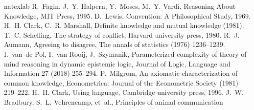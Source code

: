 \documentclass[twocolumn,a4paper,superscriptaddress,nofootinbib]{revtex4}
\begin{document}
\if{} 
\begin{thebibliography}{71}
\expandafter\ifx\csname natexlab\endcsname\relax\def\natexlab#1{#1}\fi
\providecommand{\bibinfo}[2]{#2}
\ifx\xfnm\relax \def\xfnm[#1]{\unskip,\space#1}\fi
\bibinfo{author}{R.~Fagin}, \bibinfo{author}{J.~Y. Halpern},
  \bibinfo{author}{Y.~Moses}, \bibinfo{author}{M.~Y. Vardi},
  \bibinfo{title}{Reasoning About Knowledge}, \bibinfo{publisher}{MIT Press},
  \bibinfo{year}{1995}.
\bibinfo{author}{D.~Lewis}, \bibinfo{title}{Convention: A Philosophical Study},
  \bibinfo{year}{1969}.
\bibinfo{author}{H.~H. Clark}, \bibinfo{author}{C.~R. Marshall},
\newblock \bibinfo{title}{Definite knowledge and mutual knowledge}
  (\bibinfo{year}{1981}).
\bibinfo{author}{T.~C. Schelling}, \bibinfo{title}{The strategy of conflict},
  \bibinfo{publisher}{Harvard university press}, \bibinfo{year}{1980}.
\bibinfo{author}{R.~J. Aumann},
\newblock \bibinfo{title}{Agreeing to disagree},
\newblock \bibinfo{journal}{The annals of statistics}  (\bibinfo{year}{1976})
  \bibinfo{pages}{1236--1239}.
\bibinfo{author}{I.~van~de Pol}, \bibinfo{author}{I.~van Rooij},
  \bibinfo{author}{J.~Szymanik},
\newblock \bibinfo{title}{Parameterized complexity of theory of mind reasoning
  in dynamic epistemic logic},
\newblock \bibinfo{journal}{Journal of Logic, Language and Information}
  \bibinfo{volume}{27} (\bibinfo{year}{2018}) \bibinfo{pages}{255--294}.
\bibinfo{author}{P.~Milgrom},
\newblock \bibinfo{title}{An axiomatic characterization of common knowledge},
\newblock \bibinfo{journal}{Econometrica: Journal of the Econometric Society}
  (\bibinfo{year}{1981}) \bibinfo{pages}{219--222}.
\bibinfo{author}{H.~H. Clark}, \bibinfo{title}{Using language},
  \bibinfo{publisher}{Cambridge university press}, \bibinfo{year}{1996}.
\bibinfo{author}{J.~W. Bradbury}, \bibinfo{author}{S.~L. Vehrencamp}, et~al.,
\newblock \bibinfo{title}{Principles of animal communication}

\end{thebibliography}
\end{document}
